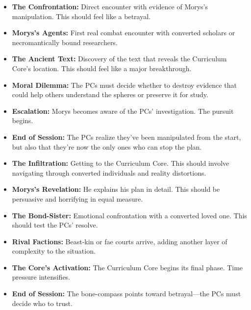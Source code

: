 \documentclass[11pt,twoside]{book}
\newenvironment{adventurebox}[1]{%
  \begin{mdframed}[%
    linewidth=2pt,%
    linecolor=black,%
    backgroundcolor=gray!10,%
    innertopmargin=10pt,%
    innerbottommargin=10pt,%
    innerrightmargin=10pt,%
    innerleftmargin=10pt,%
    frametitle={#1},%
    frametitlefont=\sffamily\bfseries,%
  ]%
}{%
  \end{mdframed}%
}
\newcommand{\sessionbox}[2]{%
  \begin{adventurebox}{Session #1: #2}
}
\newcommand{\endsession}{%
  \end{adventurebox}
}
\begin{document}
\sessionbox{3}{Necromantic Revelations}
\begin{itemize}
    \item \textbf{The Confrontation:} Direct encounter with evidence of Morys's manipulation. This should feel like a betrayal.
    \item \textbf{Morys's Agents:} First real combat encounter with converted scholars or necromantically bound researchers.
    \item \textbf{The Ancient Text:} Discovery of the text that reveals the Curriculum Core's location. This should feel like a major breakthrough.
    \item \textbf{Moral Dilemma:} The PCs must decide whether to destroy evidence that could help others understand the spheres or preserve it for study.
    \item \textbf{Escalation:} Morys becomes aware of the PCs' investigation. The pursuit begins.
    \item \textbf{End of Session:} The PCs realize they've been manipulated from the start, but also that they're now the only ones who can stop the plan.
\end{itemize}
\endsession

\sessionbox{4}{The Heart of Learning}
\begin{itemize}
    \item \textbf{The Infiltration:} Getting to the Curriculum Core. This should involve navigating through converted individuals and reality distortions.
    \item \textbf{Morys's Revelation:} He explains his plan in detail. This should be persuasive and horrifying in equal measure.
    \item \textbf{The Bond-Sister:} Emotional confrontation with a converted loved one. This should test the PCs' resolve.
    \item \textbf{Rival Factions:} Beast-kin or fae courts arrive, adding another layer of complexity to the situation.
    \item \textbf{The Core's Activation:} The Curriculum Core begins its final phase. Time pressure intensifies.
    \item \textbf{End of Session:} The bone-compass points toward betrayal---the PCs must decide who to trust.
\end{itemize}
\endsession
\end{document}
